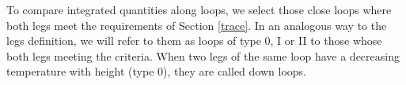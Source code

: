\documentclass[namedreferences]{solarphysics}
\def\diego#1{\textcolor{red}{#1}}
\begin{document}
\begin{article}




To compare integrated quantities along loops, we select those close loops where both legs meet the requirements of Section \ref{trace}. In an analogous way to the legs definition, we will refer to them as loops of type 0, I or II to those whose both legs meeting the criteria. When two legs of the same loop have a decreasing temperature with height (type 0), they are called down loops.



\end{article}
\end{document}
